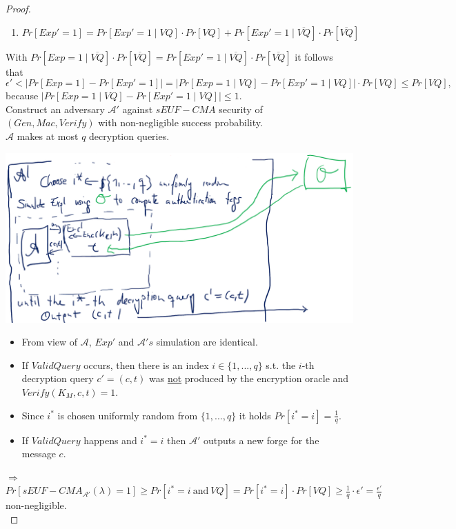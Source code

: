 \begin{proof}
\begin{enumerate}
			\item $Pr[Exp'=1] = Pr[Exp'=1 \mid VQ] \cdot Pr[VQ] + Pr[Exp'=1 \mid \overline{VQ}] \cdot Pr[\overline{VQ}]$
		\end{enumerate}
		With $Pr[Exp=1 \mid \overline{VQ}] \cdot Pr[\overline{VQ}] = Pr[Exp'=1 \mid \overline{VQ}] \cdot Pr[\overline{VQ}]$ it follows that
		$$\epsilon' < |Pr[Exp=1]-Pr[Exp'=1]| = |Pr[Exp=1 \mid VQ]-Pr[Exp'=1 \mid VQ]| \cdot Pr[VQ] \leq Pr[VQ] \text{,}$$
		because $|Pr[Exp=1 \mid VQ]-Pr[Exp'=1 \mid VQ]| \leq 1$.\\
		Construct an adversary $\mathcal{A}'$ against $sEUF-CMA$ security of $(Gen,Mac,Verify)$ with non-negligible success probability.\\
		$\mathcal{A}$ makes at most $q$ decryption queries.
		\begin{center}
			\includegraphics[width=160mm]{Graphics/Chosen Ciphertext Security/ccs4.png}
		\end{center}
		\begin{itemize}
			\item From view of $\mathcal{A}$, $Exp'$ and $\mathcal{A}'s$ simulation are identical.
			\item If $ValidQuery$ occurs, then there is an index $i \in \{1,...,q\}$ s.t. the $i$-th decryption query $c' = (c,t)$ 
			was \underline{not} produced by the encryption oracle and $Verify(K_M,c,t)=1$.
			\item Since $i^*$ is chosen uniformly random from $\{1,...,q\}$ it holds $Pr[i^* = i] = \frac{1}{q}$.
			\item If $ValidQuery$ happens and $i^* = i$ then $\mathcal{A}'$ outputs a new forge for the message $c$.
		\end{itemize}
		$\Rightarrow$ $Pr[sEUF-CMA_{\mathcal{A}'}(\lambda) = 1] \geq Pr[i^* = i \  \text{and} \  VQ] = Pr[i^* = i] \cdot Pr[VQ] \geq \frac{1}{q} \cdot \epsilon' = \frac{\epsilon'}{q}$
		non-negligible.\\

\end{proof}
